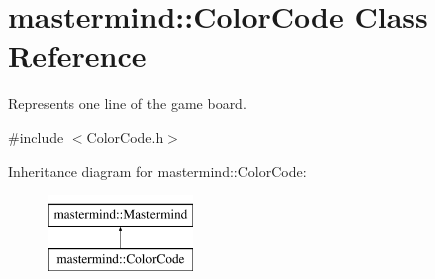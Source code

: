 \hypertarget{classmastermind_1_1_color_code}{}\section{mastermind\+:\+:Color\+Code Class Reference}
\label{classmastermind_1_1_color_code}


Represents one line of the game board.  




{\ttfamily \#include $<$Color\+Code.\+h$>$}

Inheritance diagram for mastermind\+:\+:Color\+Code\+:\begin{figure}[H]
\begin{center}
\leavevmode
\includegraphics[height=2.000000cm]{classmastermind_1_1_color_code}
\end{center}
\end{figure}
